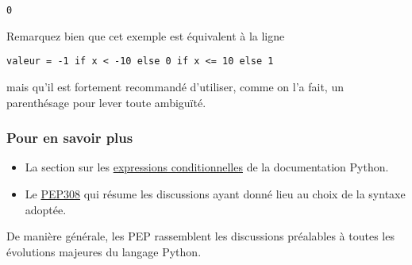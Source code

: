     \begin{Verbatim}[commandchars=\\\{\}]
0

    \end{Verbatim}

    Remarquez bien que cet exemple est équivalent à la ligne

\begin{verbatim}
valeur = -1 if x < -10 else 0 if x <= 10 else 1
\end{verbatim}

mais qu'il est fortement recommandé d'utiliser, comme on l'a fait, un
parenthésage pour lever toute ambiguïté.

    \hypertarget{pour-en-savoir-plus}{%
\subsubsection{Pour en savoir plus}\label{pour-en-savoir-plus}}

    \begin{itemize}
\tightlist
\item
  La section sur les
  \href{https://docs.python.org/3/reference/expressions.html\#conditional-expressions}{expressions
  conditionnelles} de la documentation Python.
\item
  Le \href{http://legacy.python.org/dev/peps/pep-0308/}{PEP308} qui
  résume les discussions ayant donné lieu au choix de la syntaxe
  adoptée.
\end{itemize}

De manière générale, les PEP rassemblent les discussions préalables à
toutes les évolutions majeures du langage Python.